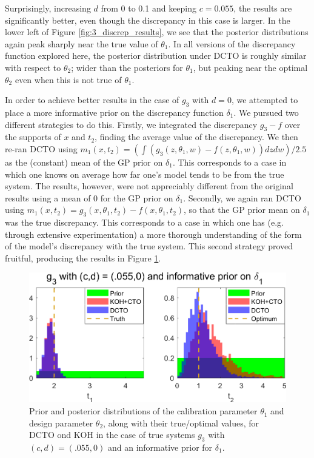 \documentclass[12pt]{article}
\begin{document}
%
Surprisingly, increasing $d$ from 0 to 0.1 and keeping $c=0.055$, the results are significantly better, even though the discrepancy in this case is larger.
%
In the lower left of Figure \ref{fig:3_discrep_results}, we see that the posterior distributions again peak sharply near the true value of $\theta_1$.
%
In all versions of the discrepancy function explored here, the posterior distribution under DCTO is roughly similar with respect to $\theta_2$; wider than the posteriors for $\theta_1$, but peaking near the optimal $\theta_2$ even when this is not true of $\theta_1$.
%

%
In order to achieve better results in the case of $g_3$ with $d=0$, we attempted to place a more informative prior on the discrepancy function $\delta_1$.
%
We pursued two different strategies to do this.
%
Firstly, we integrated the discrepancy $g_3-f$ over the supports of $x$ and $t_2$, finding the average value of the discrepancy.
%
We then re-ran DCTO using $m_1(x,t_2)=\left(\int (g_3(z,\theta_1,w)-f(z,\theta_1,w))dzdw\right)/2.5$ as the (constant) mean of the GP prior on $\delta_1$.
%
This corresponds to a case in which one knows on average how far one's model tends to be from the true system.
%
The results, however, were not appreciably different from the original results using a mean of 0 for the GP prior on $\delta_1$.
%
Secondly, we again ran DCTO using $m_1(x,t_2) = g_3(x,\theta_1,t_2)-f(x,\theta_1,t_2)$, so that the GP prior mean on $\delta_1$ was the true discrepancy.
%
This corresponds to a case in which one has (e.g. through extensive experimentation) a more thorough understanding of the form of the model's discrepancy with the true system.
%
This second strategy proved fruitful, producing the results in Figure \ref{fig:3_informative_discrep_results}.
%
\begin{figure}
\centering
\includegraphics[scale=0.85]{FIG_KOHCTO_DCTO_comp_discrep5_inf_results}
\captionsetup{width=.85\linewidth}
\caption{Prior and posterior distributions of the calibration parameter $\theta_1$ and design parameter $\theta_2$, along with their true/optimal values, for DCTO ond KOH in the case of true systems $g_3$ with $(c,d)=(.055,0)$ and an informative prior for $\delta_1$.}
\label{fig:3_informative_discrep_results}
\end{figure}
\end{document}

